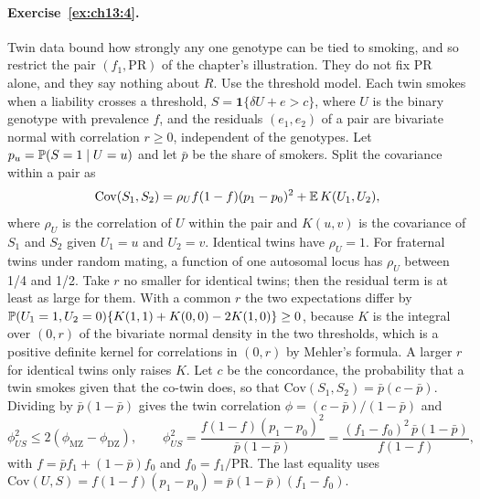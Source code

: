 \paragraph{Exercise~\ref{ex:ch13:4}.} Twin data bound how strongly any one genotype can be tied to smoking, and so restrict the pair $(f_1, \mathrm{PR})$ of the chapter's illustration. They do not fix PR alone, and they say nothing about $R$. Use the threshold model. Each twin smokes when a liability crosses a threshold, $S = \mathbf 1\{\delta U + e > c\}$, where $U$ is the binary genotype with prevalence $f$, and the residuals $(e_1, e_2)$ of a pair are bivariate normal with correlation $r \geq 0$, independent of the genotypes. Let $p_u = \mathbb{P}(S = 1 \mid U = u)$ and let $\bar p$ be the share of smokers. Split the covariance within a pair as
\[
\mathrm{Cov}(S_1, S_2) = \rho_U f(1 - f)(p_1 - p_0)^2 + \mathbb{E}\,K(U_1, U_2),
\]
where $\rho_U$ is the correlation of $U$ within the pair and $K(u, v)$ is the covariance of $S_1$ and $S_2$ given $U_1 = u$ and $U_2 = v$. Identical twins have $\rho_U = 1$. For fraternal twins under random mating, a function of one autosomal locus has $\rho_U$ between 1/4 and 1/2. Take $r$ no smaller for identical twins; then the residual term is at least as large for them. With a common $r$ the two expectations differ by $\mathbb{P}(U_1 = 1, U_2 = 0)\{K(1, 1) + K(0, 0) - 2K(1, 0)\} \geq 0$, because $K$ is the integral over $(0, r)$ of the bivariate normal density in the two thresholds, which is a positive definite kernel for correlations in $(0, r)$ by Mehler's formula. A larger $r$ for identical twins only raises $K$. Let $c$ be the concordance, the probability that a twin smokes given that the co-twin does, so that $\mathrm{Cov}(S_1, S_2) = \bar p(c - \bar p)$. Dividing by $\bar p(1 - \bar p)$ gives the twin correlation $\phi = (c - \bar p)/(1 - \bar p)$ and
\[
\phi_{US}^2 \leq 2(\phi_{\mathrm{MZ}} - \phi_{\mathrm{DZ}}), \qquad \phi_{US}^2 = \frac{f(1 - f)(p_1 - p_0)^2}{\bar p(1 - \bar p)} = \frac{(f_1 - f_0)^2\,\bar p(1 - \bar p)}{f(1 - f)},
\]
with $f = \bar pf_1 + (1 - \bar p)f_0$ and $f_0 = f_1/\mathrm{PR}$. The last equality uses $\mathrm{Cov}(U, S) = f(1 - f)(p_1 - p_0) = \bar p(1 - \bar p)(f_1 - f_0)$.

